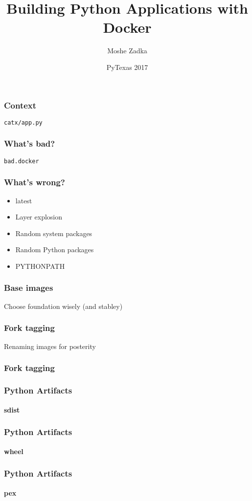 \documentclass{beamer}
\title{Building Python Applications with Docker}
\author{Moshe Zadka}
\date{PyTexas 2017}
\begin{document}
 
\frame{\titlepage}

\begin{frame}[fragile]
\frametitle{Context}
\verb|catx/app.py|

\end{frame}

\begin{frame}[fragile]
\frametitle{What's bad?}
\verb|bad.docker|

\end{frame}

\begin{frame}[fragile]
\frametitle{What's wrong?}
\begin{itemize}
\item latest \pause
\item Layer explosion \pause
\item Random system packages \pause
\item Random Python packages \pause
\item PYTHONPATH
\end{itemize}
\end{frame}

\begin{frame}
\frametitle{Base images}
Choose foundation wisely (and stabley)
\end{frame}

\begin{frame}
\frametitle{Fork tagging}
Renaming images for posterity
\end{frame}

\begin{frame}[fragile]
\frametitle{Fork tagging}

\end{frame}

\begin{frame}[fragile]
\frametitle{Python Artifacts}
\framesubtitle{sdist}
\end{frame}

\begin{frame}[fragile]
\frametitle{Python Artifacts}
\framesubtitle{wheel}
\end{frame}

\begin{frame}[fragile]
\frametitle{Python Artifacts}
\framesubtitle{pex}
\end{frame}
\end{document}
